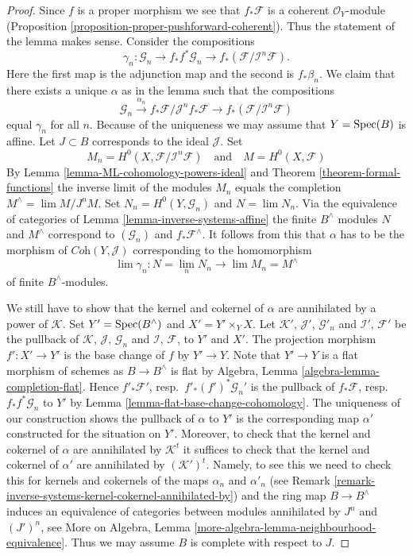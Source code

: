 \begin{proof}
Since $f$ is a proper morphism we see that $f_*\mathcal{F}$
is a coherent $\mathcal{O}_Y$-module
(Proposition \ref{proposition-proper-pushforward-coherent}).
Thus the statement of the lemma makes sense.
Consider the compositions
$$
\gamma_n : \mathcal{G}_n \to
f_*f^*\mathcal{G}_n \to
f_*(\mathcal{F}/\mathcal{I}^n\mathcal{F}).
$$
Here the first map is the adjunction map and the second is $f_*\beta_n$.
We claim that there exists a unique $\alpha$ as in the lemma
such that the compositions
$$
\mathcal{G}_n \xrightarrow{\alpha_n}
f_*\mathcal{F}/\mathcal{J}^nf_*\mathcal{F} \to
f_*(\mathcal{F}/\mathcal{I}^n\mathcal{F})
$$
equal $\gamma_n$ for all $n$. Because of the uniqueness we may assume
that $Y = \mathop{\mathrm{Spec}}(B)$ is affine. Let $J \subset B$ corresponds to the
ideal $\mathcal{J}$. Set
$$
M_n = H^0(X, \mathcal{F}/\mathcal{I}^n\mathcal{F})
\quad\text{and}\quad
M = H^0(X, \mathcal{F})
$$
By Lemma \ref{lemma-ML-cohomology-powers-ideal} and
Theorem \ref{theorem-formal-functions}
the inverse limit of the modules
$M_n$ equals the completion $M^\wedge = \lim M/J^nM$.
Set $N_n = H^0(Y, \mathcal{G}_n)$ and $N = \lim N_n$.
Via the equivalence of categories of
Lemma \ref{lemma-inverse-systems-affine}
the finite $B^\wedge$ modules $N$ and $M^\wedge$ correspond
to $(\mathcal{G}_n)$ and $f_*\mathcal{F}^\wedge$.
It follows from this that $\alpha$ has to be the morphism of
$\textit{Coh}(Y, \mathcal{J})$ corresponding to the homomorphism
$$
\lim \gamma_n : N = \lim_n N_n \longrightarrow \lim M_n = M^\wedge
$$
of finite $B^\wedge$-modules.

\medskip\noindent
We still have to show that the kernel and cokernel of $\alpha$ are
annihilated by a power of $\mathcal{K}$. Set $Y' = \mathop{\mathrm{Spec}}(B^\wedge)$
and $X' = Y' \times_Y X$. Let $\mathcal{K}'$, $\mathcal{J}'$, $\mathcal{G}'_n$
and $\mathcal{I}'$, $\mathcal{F}'$ be the pullback of
$\mathcal{K}$, $\mathcal{J}$, $\mathcal{G}_n$ and
$\mathcal{I}$, $\mathcal{F}$, to $Y'$ and $X'$.
The projection morphism $f' : X' \to Y'$ is the base change of
$f$ by $Y' \to Y$. Note that $Y' \to Y$ is a flat morphism of schemes
as $B \to B^\wedge$ is flat by
Algebra, Lemma \ref{algebra-lemma-completion-flat}.
Hence $f'_*\mathcal{F}'$, resp.\ $f'_*(f')^*\mathcal{G}_n'$
is the pullback of $f_*\mathcal{F}$, resp.\ $f_*f^*\mathcal{G}_n$
to $Y'$ by Lemma \ref{lemma-flat-base-change-cohomology}.
The uniqueness of our construction shows the pullback of $\alpha$ to $Y'$
is the corresponding map $\alpha'$ constructed for the situation on $Y'$.
Moreover, to check that the kernel and cokernel of $\alpha$ are
annihilated by $\mathcal{K}^t$ it suffices to check that the
kernel and cokernel of $\alpha'$ are annihilated by
$(\mathcal{K}')^t$. Namely, to see this we need to check this for
kernels and cokernels of the maps $\alpha_n$ and $\alpha'_n$
(see Remark \ref{remark-inverse-systems-kernel-cokernel-annihilated-by})
and the ring map $B \to B^\wedge$ induces
an equivalence of categories between modules annihilated by
$J^n$ and $(J')^n$, see
More on Algebra, Lemma \ref{more-algebra-lemma-neighbourhood-equivalence}.
Thus we may assume $B$ is complete with respect to $J$.


\end{proof}
